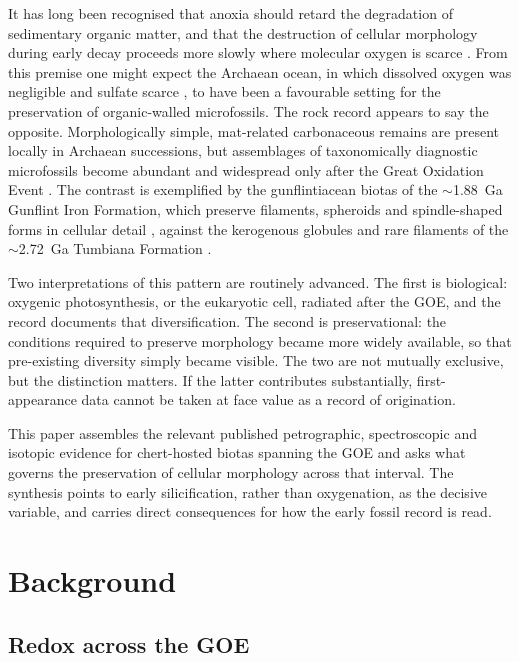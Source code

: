 \documentclass[11pt]{article}
\begin{document}
It has long been recognised that anoxia should retard the degradation of sedimentary organic matter,
and that the destruction of cellular morphology during early decay proceeds more slowly where
molecular oxygen is scarce \citep{Canfield1994,Hedges1995}. From this premise one might expect the
Archaean ocean, in which dissolved oxygen was negligible \citep{Pavlov2002} and sulfate scarce
\citep{Habicht2002,Crowe2014}, to have been a favourable setting for the preservation of organic-walled
microfossils. The rock record appears to say the opposite. Morphologically simple, mat-related
carbonaceous remains are present locally in Archaean successions, but assemblages of taxonomically
diagnostic microfossils become abundant and widespread only after the Great Oxidation Event
\citep{Javaux2018,Wacey2014}. The contrast is exemplified by the gunflintiacean biotas of the
$\sim$1.88~Ga Gunflint Iron Formation, which preserve filaments, spheroids and spindle-shaped forms
in cellular detail \citep{Lepot2017}, against the kerogenous globules and rare filaments of the
$\sim$2.72~Ga Tumbiana Formation \citep{Lepot2009}.

Two interpretations of this pattern are routinely advanced. The first is biological: oxygenic
photosynthesis, or the eukaryotic cell, radiated after the GOE, and the record documents that
diversification. The second is preservational: the conditions required to preserve morphology became
more widely available, so that pre-existing diversity simply became visible. The two are not mutually
exclusive, but the distinction matters. If the latter contributes substantially, first-appearance
data cannot be taken at face value as a record of origination.

This paper assembles the relevant published petrographic, spectroscopic and isotopic evidence for
chert-hosted biotas spanning the GOE and asks what governs the preservation of cellular morphology
across that interval. The synthesis points to early silicification, rather than oxygenation, as the
decisive variable, and carries direct consequences for how the early fossil record is read.

\section{Background}

\subsection{Redox across the GOE}
\end{document}
